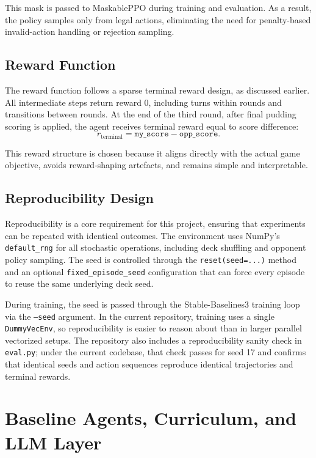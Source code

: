 \documentclass[10pt]{article}
\begin{document}
This mask is passed to MaskablePPO during training and evaluation. As a result, the policy samples only from legal actions, eliminating the need for penalty-based invalid-action handling or rejection sampling.

\subsection{Reward Function}

The reward function follows a sparse terminal reward design, as discussed earlier. All intermediate steps return reward 0, including turns within rounds and transitions between rounds. At the end of the third round, after final pudding scoring is applied, the agent receives terminal reward equal to score difference:
\[
r_{\text{terminal}} = \texttt{my\_score} - \texttt{opp\_score}.
\]

This reward structure is chosen because it aligns directly with the actual game objective, avoids reward-shaping artefacts, and remains simple and interpretable.

\subsection{Reproducibility Design}

Reproducibility is a core requirement for this project, ensuring that experiments can be repeated with identical outcomes. The environment uses NumPy's \texttt{default\_rng} for all stochastic operations, including deck shuffling and opponent policy sampling. The seed is controlled through the \texttt{reset(seed=...)} method and an optional \texttt{fixed\_episode\_seed} configuration that can force every episode to reuse the same underlying deck seed.

During training, the seed is passed through the Stable-Baselines3 training loop via the \texttt{--seed} argument. In the current repository, training uses a single \texttt{DummyVecEnv}, so reproducibility is easier to reason about than in larger parallel vectorized setups. The repository also includes a reproducibility sanity check in \texttt{eval.py}; under the current codebase, that check passes for seed 17 and confirms that identical seeds and action sequences reproduce identical trajectories and terminal rewards.

\section{Baseline Agents, Curriculum, and LLM Layer}
\end{document}
